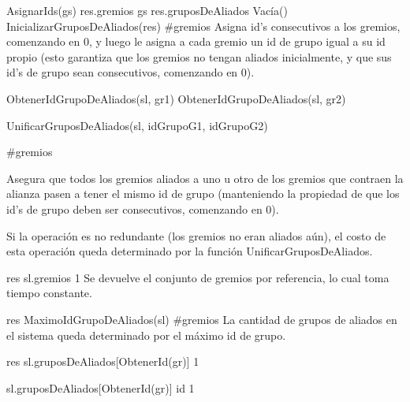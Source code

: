 {
	\state AsignarIds(gs)								
	\state res.gremios \asig gs 						
	\state
	\state res.gruposDeAliados \asig Vac\'ia()			
	\state InicializarGruposDeAliados(res)				
}
{\#gremios}
{Asigna id's consecutivos a los gremios, comenzando en 0, y luego le asigna a cada gremio un id de grupo igual a su id propio (esto garantiza que los gremios no tengan aliados inicialmente, y que sus id's de grupo sean consecutivos, comenzando en 0). }

{
	\state {} \asig ObtenerIdGrupoDeAliados(sl, gr1)			
	\state {} \asig ObtenerIdGrupoDeAliados(sl, gr2)			
	\state 

													
		\state UnificarGruposDeAliados(sl, idGrupoG1, idGrupoG2)					
	\endif
}
{\#gremios}
{ Asegura que todos los gremios aliados a uno u otro de los gremios que contraen la alianza pasen a tener el mismo id de grupo (manteniendo la propiedad de que los id's de grupo deben ser consecutivos, comenzando en 0).

\hspace{10pt} Si la operaci\'on es no redundante (los gremios no eran aliados a\'un), el costo de esta operaci\'on queda determinado por la funci\'on UnificarGruposDeAliados. }

{
	\state res \asig sl.gremios								
}
{1}
{ Se devuelve el conjunto de gremios por referencia, lo cual toma tiempo constante. }

{
	\state res \asig MaximoIdGrupoDeAliados(sl)			
}
{\#gremios}
{La cantidad de grupos de aliados en el sistema queda determinado por el m\'aximo id de grupo.}

{
	\state res \asig sl.gruposDeAliados[ObtenerId(gr)]			
}
{1}
{}

{
	\state sl.gruposDeAliados[ObtenerId(gr)] \asig id			
}
{1}
{}

